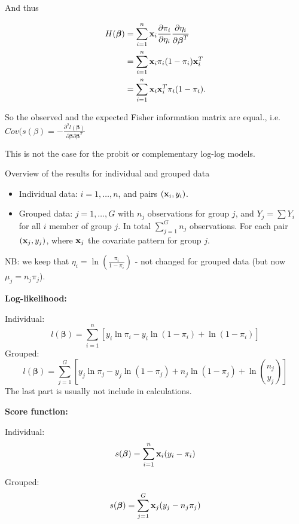 \documentclass[
  ignorenonframetext,
]{beamer}
\providecommand{\tightlist}{%
  \setlength{\itemsep}{0pt}\setlength{\parskip}{0pt}}
\begin{document}
\begin{frame}
And thus

\[
\begin{aligned}
H(\boldsymbol{\beta}) &=\sum_{i=1}^n {\bf x}_i \frac{\partial \pi_i}{\partial \eta_i} \frac{\partial \eta_i}{\partial \boldsymbol{\beta}^T} \\
&=\sum_{i=1}^n {\bf x}_i\pi_i(1-\pi_i) {\bf x}_i^T\\
&= \sum_{i=1}^n {\bf x}_i{\bf x}_i^T \pi_i(1-\pi_i).
\end{aligned}
\]

So the observed and the expected Fisher information matrix are equal.,
i.e.~\(Cov(s(\beta) = -\frac{\partial^2l(\boldsymbol{\beta})}{\partial\boldsymbol{\beta}\partial\boldsymbol{\beta}^T}\)

This is not the case for the probit or complementary log-log models.
\end{frame}

\begin{frame}
\begin{block}{Overview of the results for individual and grouped data}
\protect\hypertarget{overview-of-the-results-for-individual-and-grouped-data}{}
\begin{itemize}
\tightlist
\item
  Individual data: \(i=1,\ldots, n\), and pairs \(({\bf x}_i,y_i)\).
\item
  Grouped data: \(j=1,\ldots, G\) with \(n_j\) observations for group
  \(j\), and \(Y_j=\sum Y_i\) for all \(i\) member of group \(j\). In
  total \(\sum_{j=1}^G n_j\) observations. For each pair
  \(({\bf x}_j, y_j)\), where \({\bf x}_j\) the covariate pattern for
  group \(j\).
\end{itemize}

NB: we keep that \(\eta_i=\ln (\frac{\pi_i}{1-\pi_i})\) - not changed
for grouped data (but now \(\mu_j=n_j\pi_j\)).
\end{block}
\end{frame}

\begin{frame}
\textbf{Log-likelihood:}

Individual:
\[l(\boldsymbol{\beta})=\sum_{i=1}^n[y_i \ln \pi_i-y_i\ln(1-\pi_i)+\ln(1-\pi_i)]\]
Grouped:
\[l(\boldsymbol{\beta})=\sum_{j=1}^G[y_j \ln \pi_j-y_j\ln(1-\pi_j)+n_j\ln(1-\pi_j)+ \ln {n_j \choose y_j}]\]
The last part is usually not include in calculations.
\end{frame}

\begin{frame}
\textbf{Score function:}

Individual: \[s(\boldsymbol{\beta})=\sum_{i=1}^n {\bf x}_i (y_i-\pi_i)\]

Grouped: \[s(\boldsymbol{\beta})=\sum_{j=1}^G {\bf x}_j (y_j-n_j\pi_j)\]
\end{frame}
\end{document}
